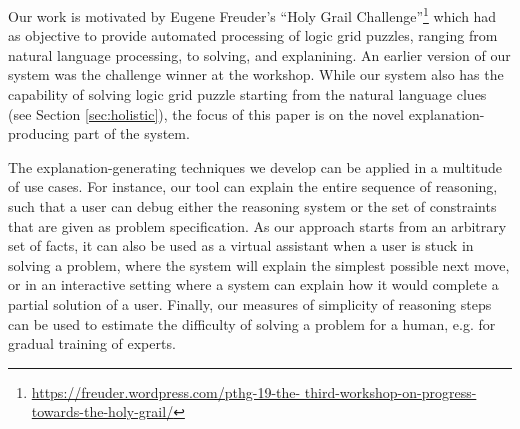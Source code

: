 Our work is motivated by Eugene Freuder's ``Holy Grail Challenge''\footnote{\tiny \url{https://freuder.wordpress.com/pthg-19-the- third-workshop-on-progress-towards-the-holy-grail/}} which had as objective to provide automated processing of logic grid puzzles, ranging from natural language processing, to solving, and explanining. 
An earlier version of our system was the challenge winner at the workshop. 
While our system also has the capability of solving logic grid puzzle starting from the natural language clues (see Section \ref{sec:holistic}), the focus of this paper is on the novel explanation-producing part of the system.

The explanation-generating techniques we develop can be applied in a multitude of use cases. 
For instance, our tool can explain the entire sequence of reasoning, such that a user can debug either the reasoning system or the set of constraints that are given as problem specification. 
As our approach starts from an arbitrary set of facts, it can also be used as a virtual assistant when a user is stuck in solving a problem, where the system will explain the simplest possible next move, or in an interactive setting where a system can explain how it would complete a partial solution of a user.
Finally, our measures of simplicity of reasoning steps can be used to estimate the difficulty of solving a problem for a human, e.g. for gradual training of experts.


